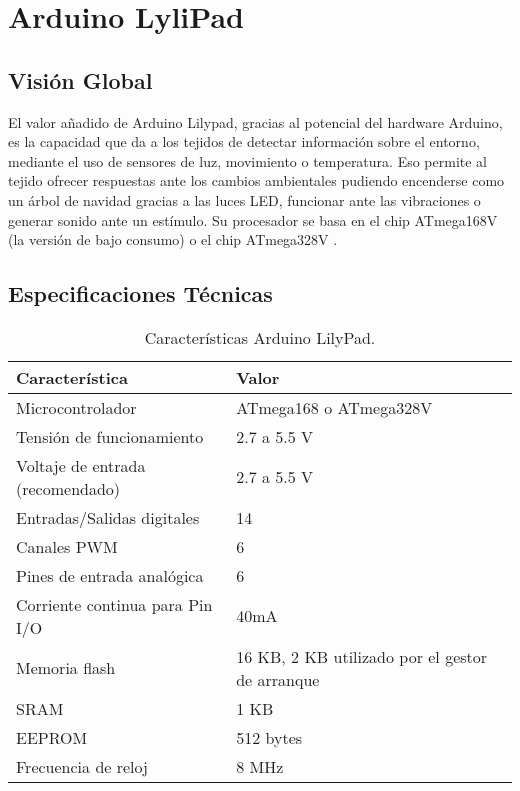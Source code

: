 \chapter{Arduino LyliPad}
\label{chap:anexo2}

\section{Visión Global}
El valor añadido de Arduino Lilypad, gracias al potencial del hardware Arduino, es la capacidad que da a los tejidos de detectar información sobre el entorno, mediante el uso de sensores de luz, movimiento o temperatura. Eso permite al tejido ofrecer respuestas ante los cambios ambientales pudiendo encenderse como un árbol de navidad gracias a las luces LED, funcionar ante las vibraciones o generar sonido ante un estímulo. Su procesador se basa en el chip ATmega168V (la versión de bajo consumo) o el chip ATmega328V . 

\section{Especificaciones Técnicas}

 \begin{table}[h!]
  \centering
  \caption{Características Arduino LilyPad. \cite{ArduinoLilyPad}}
  \label{tab:LilyPad}
  \begin{tabular}{p{}p{}}
    \hline
    \textbf{Característica} & \textbf{Valor} \\
    \hline
    Microcontrolador & ATmega168 o ATmega328V \\
    Tensión de funcionamiento & 2.7 a 5.5 V \\
    Voltaje de entrada (recomendado) & 2.7 a 5.5 V\\
    Entradas/Salidas digitales & 14 \\
    Canales PWM & 6 \\
    Pines de entrada analógica & 6 \\
    Corriente continua para Pin I/O & 40mA \\
    Memoria flash & 16 KB, 2 KB utilizado por el gestor de arranque \\
    SRAM & 1 KB \\
    EEPROM & 512 bytes \\
    Frecuencia de reloj & 8 MHz \\
    \hline
  \end{tabular}
\end{table}